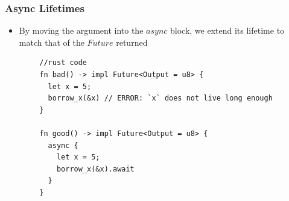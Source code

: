 \begin{frame}[fragile]
    \frametitle{Async Lifetimes}
    \begin{itemize}
        \item By moving the argument into the \(async\) block, we extend its lifetime to match that of the \(Future\) returned
    \end{itemize}
    \begin{block}{}
        \begin{verbatim}
        //rust code
        fn bad() -> impl Future<Output = u8> {
          let x = 5;
          borrow_x(&x) // ERROR: `x` does not live long enough
        }
        
        fn good() -> impl Future<Output = u8> {
          async {
            let x = 5;
            borrow_x(&x).await
          }
        }
        \end{verbatim}
    \end{block}
    
\end{frame}

